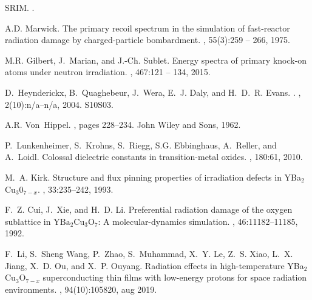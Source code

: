 \documentclass[square,aip,preprint,showkeys,superscriptaddress]{revtex4}
\begin{document}
\begin{thebibliography}{10}
	SRIM.
	.
	
	A.D. Marwick.
	\newblock The primary recoil spectrum in the simulation of fast-reactor
	radiation damage by charged-particle bombardment.
	, 55(3):259 -- 266, 1975.
	
	M.R. Gilbert, J.~Marian, and J.-Ch. Sublet.
	\newblock Energy spectra of primary knock-on atoms under neutron irradiation.
	, 467:121 -- 134, 2015.
	
	D.~Heynderickx, B.~Quaghebeur, J.~Wera, E.~J. Daly, and H.~D.~R. Evans.
	.
	, 2(10):n/a--n/a, 2004.
	\newblock S10S03.
	
	A.R. Von~Hippel.
	, pages 228--234.
	\newblock John Wiley and Sons, 1962.
	
	P.~Lunkenheimer, S.~Krohns, S.~Riegg, S.G. Ebbinghaus, A.~Reller, and A.~Loidl.
	\newblock Colossal dielectric constants in transition-metal oxides.
	, 180:61, 2010.
	
	M.~A. Kirk.
	\newblock Structure and flux pinning properties of irradiation defects in
	{YBa$_2$Cu$_3$0$_{7-x}$}.
	, 33:235--242, 1993.
	
	F.~Z. Cui, J.~Xie, and H.~D. Li.
	\newblock Preferential radiation damage of the oxygen sublattice in
	{${\mathrm{YBa}}_{2}$${\mathrm{Cu}}_{3}$${\mathrm{O}}_{7}$}: A
	molecular-dynamics simulation.
	, 46:11182--11185, 1992.
	
	F.~Li, S.~Sheng Wang, P.~Zhao, S.~Muhammad, X.~Y. Le, Z.~S. Xiao, L.~X. Jiang,
	X.~D. Ou, and X.~P. Ouyang.
	\newblock Radiation effects in high-temperature {YBa$_2$Cu$_3$O$_{7-x}$}
	superconducting thin films with low-energy protons for space radiation
	environments.
	, 94(10):105820, aug 2019.
	
\end{thebibliography}
\end{document}

